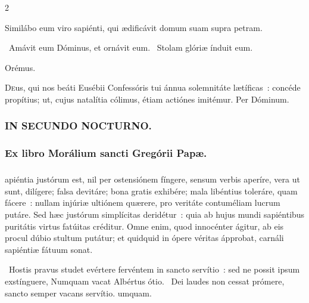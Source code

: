 \documentclass[9pt,twoside]{extarticle}
\begin{document}
\begin{multicols}{2}
{{\begin{tightlist}{}
\item {} Similábo eum viro sapiénti, qui ædificávit domum suam supra petram.
\item {}~Amávit eum Dóminus, et ornávit eum. ~Stolam glóriæ índuit eum.
\item Orémus. \hfill {}
\end{tightlist}
\lettrine{D}eus, qui nos beáti Eusébii Confessóris tui ánnua solemnitáte lætíficas~: concéde propítius; ut, cujus natalítia cólimus, étiam actiónes imitémur. Per Dóminum.

\begin{tightlist}{}
\item {}
\end{tightlist}

\subsubsection*{\center \textsc{IN SECUNDO NOCTURNO.}}
\subsubsection*{\center Ex libro Morálium sancti Gregórii Papæ.}
\subsubsection*{\center {}}
apiéntia justórum est, nil per ostensiónem fíngere, sensum verbis aperíre, vera ut sunt, dilígere; falsa devitáre; bona gratis exhibére; mala libéntius toleráre, quam fácere~: nullam injúriæ ultiónem quærere, pro veritáte contuméliam lucrum putáre. Sed hæc justórum simplícitas deridétur~: quia ab hujus mundi sapiéntibus puritátis virtus fatúitas créditur. Omne enim, quod innocénter ágitur, ab eis procul dúbio stultum putátur; et quidquid in ópere véritas ápprobat, carnáli sapiéntiæ fátuum sonat.

\begin{tightlist}{}
\item {}~Hostis pravus studet evértere fervéntem in sancto servítio~: sed ne possit ipsum exstínguere, \textred{*} Numquam vacat Albértus ótio.
~Dei laudes non cessat prómere, sancto semper vacans servítio. umquam.
\end{tightlist}

}}
\end{multicols}
\end{document}

